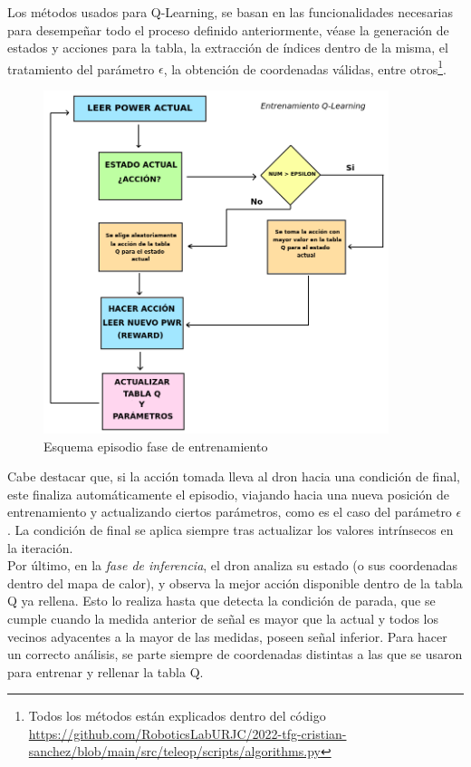 Los métodos usados para Q-Learning, se basan en las funcionalidades necesarias para desempeñar todo el proceso definido anteriormente, véase la generación de estados y acciones para la tabla, la extracción de índices dentro de la misma, el tratamiento del parámetro $\epsilon$, la obtención de coordenadas válidas, entre otros\footnote[3]{Todos los métodos están explicados dentro del código \url{https://github.com/RoboticsLabURJC/2022-tfg-cristian-sanchez/blob/main/src/teleop/scripts/algorithms.py}}.\\

\begin{figure} [H]
    \begin{center}
    \includegraphics[height=10cm]{imagenes/cap4/11_diagrama_training.png}
    \end{center}
    \caption[Esquema episodio fase de entrenamiento]{Esquema episodio fase de entrenamiento}
    \label{fig:training_phase}
\end{figure}

Cabe destacar que, si la acción tomada lleva al dron hacia una condición de final, este finaliza automáticamente el episodio, viajando hacia una nueva posición de entrenamiento y actualizando ciertos parámetros, como es el caso  del parámetro $\epsilon$. La condición de final se aplica siempre tras actualizar los valores intrínsecos en la iteración.\\

Por último, en la \emph{fase de inferencia}, el dron analiza su estado (o sus coordenadas dentro del mapa de calor), y observa la mejor acción disponible dentro de la tabla Q ya rellena. Esto lo realiza hasta que detecta la condición de parada, que se cumple cuando la medida anterior de señal es mayor que la actual y todos los vecinos adyacentes a la mayor de las medidas, poseen señal inferior. Para hacer un correcto análisis, se parte siempre de coordenadas distintas a las que se usaron para entrenar y rellenar la tabla Q.

